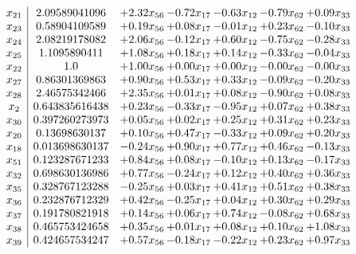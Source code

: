 \documentclass[8pt]{article}
\begin{document}
\[\begin{array}{c| c c@{\hskip 2pt} c@{\hskip 2pt} c@{\hskip 2pt} c@{\hskip 2pt} c@{\hskip 2pt} }
 x_{21}   &  2.09589041096 & +  2.32 x_{56} & -0.72 x_{17} & -0.63 x_{12} & -0.79 x_{62} & +  0.09 x_{33}\\
 x_{23}   &  0.58904109589 & +  0.19 x_{56} & +  0.08 x_{17} & -0.01 x_{12} & +  0.23 x_{62} & -0.10 x_{33}\\
 x_{24}   &  2.08219178082 & +  2.06 x_{56} & -0.12 x_{17} & +  0.60 x_{12} & -0.75 x_{62} & -0.28 x_{33}\\
 x_{25}   &  1.1095890411 & +  1.08 x_{56} & +  0.18 x_{17} & +  0.14 x_{12} & -0.33 x_{62} & -0.04 x_{33}\\
 x_{22}   &  1.0 & +  1.00 x_{56} & +  0.00 x_{17} & +  0.00 x_{12} & -0.00 x_{62} & -0.00 x_{33}\\
 x_{27}   &  0.86301369863 & +  0.90 x_{56} & +  0.53 x_{17} & +  0.33 x_{12} & -0.09 x_{62} & -0.20 x_{33}\\
 x_{28}   &  2.46575342466 & +  2.35 x_{56} & +  0.01 x_{17} & +  0.08 x_{12} & -0.90 x_{62} & +  0.08 x_{33}\\
 x_{2}   &  0.643835616438 & +  0.23 x_{56} & -0.33 x_{17} & -0.95 x_{12} & +  0.07 x_{62} & +  0.38 x_{33}\\
 x_{30}   &  0.397260273973 & +  0.05 x_{56} & +  0.02 x_{17} & +  0.25 x_{12} & +  0.31 x_{62} & +  0.23 x_{33}\\
 x_{20}   &  0.13698630137 & +  0.10 x_{56} & +  0.47 x_{17} & -0.33 x_{12} & +  0.09 x_{62} & +  0.20 x_{33}\\
 x_{18}   &  0.013698630137 & -0.24 x_{56} & +  0.90 x_{17} & +  0.77 x_{12} & +  0.46 x_{62} & -0.13 x_{33}\\
 x_{51}   &  0.123287671233 & +  0.84 x_{56} & +  0.08 x_{17} & -0.10 x_{12} & +  0.13 x_{62} & -0.17 x_{33}\\
 x_{32}   &  0.698630136986 & +  0.77 x_{56} & -0.24 x_{17} & +  0.12 x_{12} & +  0.40 x_{62} & +  0.36 x_{33}\\
 x_{35}   &  0.328767123288 & -0.25 x_{56} & +  0.03 x_{17} & +  0.41 x_{12} & +  0.51 x_{62} & +  0.38 x_{33}\\
 x_{36}   &  0.232876712329 & +  0.42 x_{56} & -0.25 x_{17} & +  0.04 x_{12} & +  0.30 x_{62} & +  0.29 x_{33}\\
 x_{37}   &  0.191780821918 & +  0.14 x_{56} & +  0.06 x_{17} & +  0.74 x_{12} & -0.08 x_{62} & +  0.68 x_{33}\\
 x_{38}   &  0.465753424658 & +  0.35 x_{56} & +  0.01 x_{17} & +  0.08 x_{12} & +  0.10 x_{62} & +  1.08 x_{33}\\
 x_{39}   &  0.424657534247 & +  0.57 x_{56} & -0.18 x_{17} & -0.22 x_{12} & +  0.23 x_{62} & +  0.97 x_{33}\\

\end{array}\]
\end{document}
